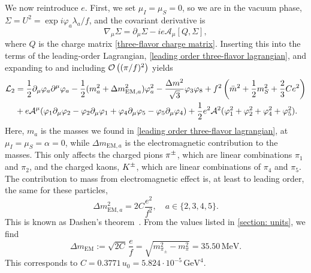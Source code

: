 We now reintroduce $e$.
First, we set $\mu_I = \mu_S = 0$, so we are in the vacuum phase, $\Sigma = U^2 = \exp{i \varphi_a \lambda_a/f}$, and the covariant derivative is
%
\begin{equation}
    \nabla_\mu \Sigma = \partial_\mu \Sigma - i e \mathcal A_\mu [Q, \Sigma],
\end{equation}
%
where $Q$ is the charge matrix \autoref{three-flavor charge matrix}.
Inserting this into the terms of the leading-order Lagrangian, \autoref{leading order three-flavor lagrangian}, and expanding to and including $\mathcal O\left((\pi/f)^2\right)$ yields
%
\begin{align}
    \nonumber
    \mathcal{L}_2
    &= 
    \frac{1}{2} \partial_\mu \varphi_a \partial^\mu \varphi_a
    - \frac{1}{2}(m_{a}^2 + \Delta m_{\text{EM},a}^2)\varphi_a^2
    - \frac{\Delta m^2}{\sqrt 3} \varphi_3 \varphi_8
    + f^2 \left(\bar m^2 + \frac{1}{2} m_S^2 + \frac{2}{3}C e^2\right)\\
    &+ e \mathcal A^\mu 
    (
        \varphi_1 \partial_\mu \varphi_2
        - \varphi_2 \partial_\mu \varphi_1
        + \varphi_4 \partial_\mu \varphi_5
        - \varphi_5 \partial_\mu \varphi_4
    )
    + \frac{1}{2} e^2 \mathcal A^2 (\varphi_1^2 +\varphi_2^2 + \varphi_4^2 +\varphi_5^2).
\end{align}
%
Here, $m_{a}$ is the masses  we found in \autoref{leading order three-flavor lagrangian}, at $\mu_I = \mu_S = \alpha = 0$, while $\Delta m_{\text{EM}, a}$ is the electromagnetic contribution to the masses.
This only affects the charged pions ${\pi^\pm}$, which are linear combinations $\pi_1$ and $\pi_2$, and the charged kaons, ${K^\pm}$, which are linear combinations of $\pi_4$ and $\pi_5$.
The contribution to mass from electromagnetic effect is, at least to leading order, the same for these particles,
%
\begin{equation}
    \Delta m_{\text{EM}, a}^2 = 2C \frac{e^2}{f^2}, \quad a \in \{2, 3, 4, 5\}.
\end{equation}
%
This is known as Dashen's theorem~\autocite{dashenChiralMathrmSUEnsuremath1969}.
From the values listed in \autoref{section: units}, we find
%
\begin{equation}
    \label{EM mass contribtuion leading order}
    \Delta m_{\text{EM}} := \sqrt{2C} \, \frac{e}{f} 
    = \sqrt{m_{\pi_\pm}^2 - m_{\pi}^2} = 35.50 \, \text{MeV}.
\end{equation}
%
This corresponds to $C = 0.3771 \, u_0 = 5.824 \cdot 10^{-5} \, \text{GeV}^4$.


